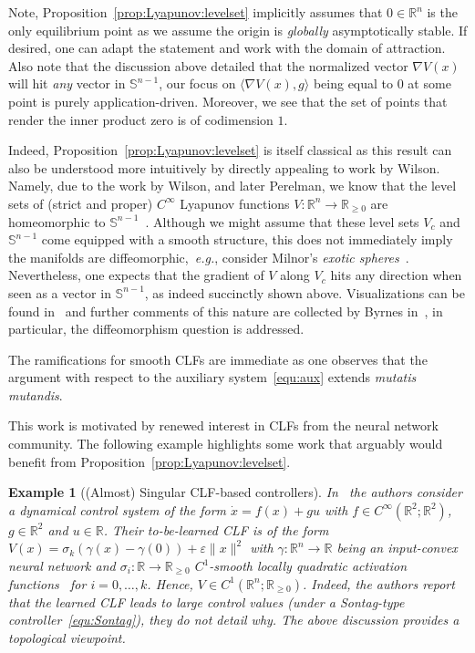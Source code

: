 \documentclass[letterpaper, 10 pt, conference]{ieeeconf}  %
\theoremstyle{mystyle}
\newtheorem{example}[theorem]{Example}
\begin{document}
Note, Proposition~\ref{prop:Lyapunov:levelset} implicitly assumes that $0\in \mathbb{R}^n$ is the only equilibrium point as we assume the origin is \textit{globally} asymptotically stable. If desired, one can adapt the statement and work with the domain of attraction. Also note that the discussion above detailed that the normalized vector $\nabla V(x)$ will hit \textit{any} vector in $\mathbb{S}^{n-1}$, our focus on $\langle \nabla V(x),g \rangle $ being equal to $0$ at some point is purely application-driven. Moreover, we see that the set of points that render the inner product zero is of codimension $1$. 

Indeed, Proposition~\ref{prop:Lyapunov:levelset} is itself classical as this result can also be understood more intuitively by directly appealing to work by Wilson. Namely, due to the work by Wilson, and later Perelman, we know that the level sets of (strict and proper) $C^{\infty}$ Lyapunov functions $V:\mathbb{R}^n\to \mathbb{R}_{\geq 0}$ are homeomorphic to $\mathbb{S}^{n-1}$~\cite{ref:wilson1967structure,ref:stillwell2012poincare}. Although we might assume that these level sets $V_c$ and $\mathbb{S}^{n-1}$ come equipped with a smooth structure, this does not immediately imply the manifolds are diffeomorphic,~\textit{e.g.}, consider Milnor's \textit{exotic spheres}~\cite{ref:Milnor7}.  Nevertheless, one expects that the gradient of $V$ along $V_c$ hits any direction when seen as a vector in $\mathbb{S}^{n-1}$, as indeed succinctly shown above. Visualizations can be found in~\cite{ref:sontag1999stability} and further comments of this nature are collected by Byrnes in~\cite{ref:byrnes2008brockett}, in particular, the diffeomorphism question is addressed.   

The ramifications for smooth CLFs are immediate as one observes that the argument with respect to the auxiliary system~\eqref{equ:aux} extends \textit{mutatis mutandis}. 

This work is motivated by renewed interest in CLFs from the neural network community. The following example highlights some work that arguably would benefit from Proposition~\ref{prop:Lyapunov:levelset}.
\begin{example}[(Almost) Singular CLF-based controllers]
In~\cite[Sec.~IV]{ref:kashima2022learning} the authors consider a dynamical control system of the form $\dot{x}=f(x)+gu$ with $f\in C^{\infty}(\mathbb{R}^2;\mathbb{R}^2)$, $g\in \mathbb{R}^2$ and $u\in \mathbb{R}$. Their to-be-learned CLF is of the form $V(x)=\sigma_k(\gamma(x)-\gamma(0))+\varepsilon \|x\|^2$ with $\gamma:\mathbb{R}^n\to \mathbb{R}$ being an input-convex neural network and $\sigma_i:\mathbb{R}\to \mathbb{R}_{\geq 0}$ { $C^{1}$-smooth locally quadratic activation functions~\cite[Eq.~(13)]{ref:kolter2019learning}} for $i=0,\dots,k$. Hence, $V\in C^{1}(\mathbb{R}^n;\mathbb{R}_{\geq 0})$. Indeed, the authors report that the learned CLF leads to large control values (under a Sontag-type controller~\eqref{equ:Sontag}), they do not detail why. The above discussion provides a topological viewpoint.  
\end{example}
\end{document}
